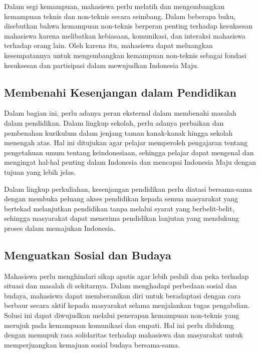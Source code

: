 Dalam segi kemampuan, mahasiswa perlu melatih dan mengembangkan kemampuan teknis dan non-teknis secara seimbang. Dalam beberapa buku, disebutkan bahwa kemampuan non-teknis berperan penting terhadap kesuksesan mahasiswa karena melibatkan kebiasaan, komunikasi, dan interaksi mahasiswa terhadap orang lain. Oleh karena itu, mahasiswa dapat meluangkan kesempatannya untuk mengembangkan kemampuan non-teknis sebagai fondasi kesuksesan dan partisipasi dalam mewujudkan Indonesia Maju.

\subsection{Membenahi Kesenjangan dalam Pendidikan}

Dalam bagian ini, perlu adanya peran eksternal dalam membenahi masalah dalam pendidikan. Dalam lingkup sekolah, perlu adanya perbaikan dan pembenahan kurikulum dalam jenjang taman kanak-kanak hingga sekolah menengah atas. Hal ini ditujukan agar pelajar memperoleh pengajaran tentang pengetahuan umum tentang keindonesiaan, sehingga pelajar dapat mengenal dan mengingat hal-hal penting dalam Indonesia dan mencapai Indonesia Maju dengan tujuan yang lebih jelas.

Dalam lingkup perkuliahan, kesenjangan pendidikan perlu diatasi bersama-sama dengan membuka peluang akses pendidikan kepada semua masyarakat yang bertekad melanjutkan pendidikan tanpa melalui syarat yang berbelit-belit, sehingga masyarakat dapat menerima pendidikan lanjutan yang mendukung proses dalam memajukan Indonesia.

\subsection{Menguatkan Sosial dan Budaya}

Mahasiswa perlu menghindari sikap apatis agar lebih peduli dan peka terhadap situasi dan masalah di sekitarnya. Dalam menghadapi perbedaan sosial dan budaya, mahasiswa dapat memberanikan diri untuk beradaptasi dengan cara berbaur secara aktif kepada masyarakat selama menjalankan tugas pengabdian. Solusi ini dapat diwujudkan melalui penerapan kemampuan non-teknis yang merujuk pada kemampuan komunikasi dan empati. Hal ini perlu didukung dengan memupuk rasa solidaritas terhadap mahasiswa dan masyarakat untuk memperjuangkan kemajuan sosial budaya bersama-sama.